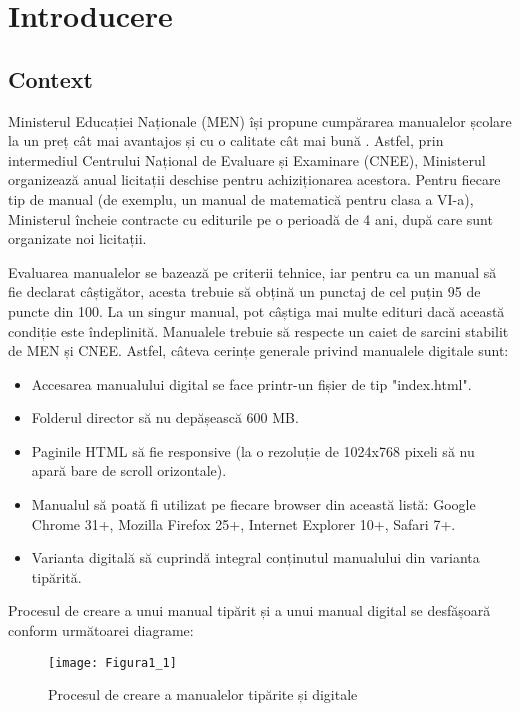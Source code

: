 \chapter{Introducere}
\section{Context}

Ministerul Educației Naționale (MEN) își propune cumpărarea manualelor școlare la un preț cât mai avantajos și cu o calitate cât mai bună \cite{minister}. Astfel, prin intermediul Centrului Național de Evaluare și Examinare (CNEE), Ministerul organizează anual licitații deschise pentru achiziționarea acestora. Pentru fiecare tip de manual (de exemplu, un manual de matematică pentru clasa a VI-a), Ministerul încheie contracte cu editurile pe o perioadă de 4 ani, după care sunt organizate noi licitații.

Evaluarea manualelor se bazează pe criterii tehnice, iar pentru ca un manual să fie declarat câștigător, acesta trebuie să obțină un punctaj de cel puțin 95 de puncte din 100. La un singur manual, pot câștiga mai multe edituri dacă această condiție este îndeplinită. Manualele trebuie să respecte un caiet de sarcini stabilit de MEN și CNEE. Astfel, câteva cerințe generale privind manualele digitale sunt: 
\begin{itemize}
	\item Accesarea manualului digital se face printr-un fișier de tip "index.html".
	\item Folderul director să nu depășească 600 MB.
	\item Paginile HTML să fie responsive (la o rezoluție de 1024x768 pixeli să nu apară bare de scroll orizontale).
	\item Manualul să poată fi utilizat pe fiecare browser din această listă: Google Chrome 31+, Mozilla Firefox 25+, Internet Explorer 10+, Safari 7+.
	\item Varianta digitală să cuprindă integral conținutul manualului din varianta tipărită.
\end{itemize}

Procesul de creare a unui manual tipărit și a unui manual digital se desfășoară conform următoarei diagrame:
\begin{figure}[H]
	\centering
	\texttt{[image: Figura1\_1]}
	\caption{Procesul de creare a manualelor tipărite și digitale}
	\label{fig:Figura1_1}
\end{figure}

